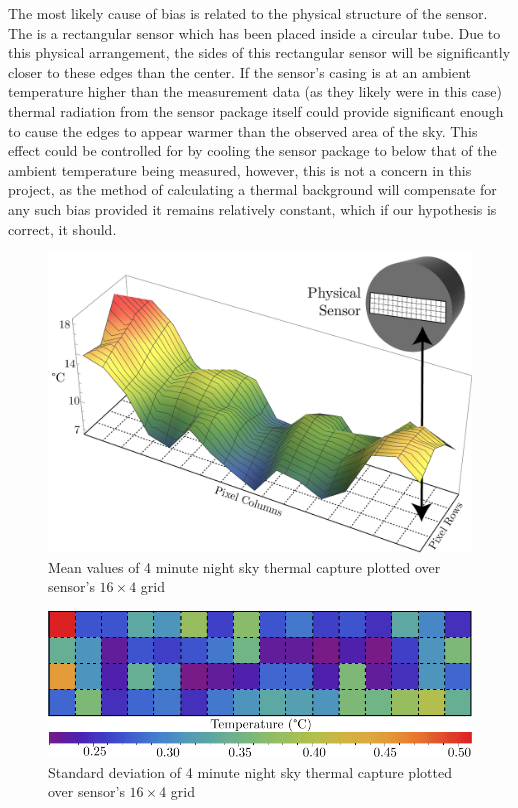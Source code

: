 \documentclass[../thesis/thesis.tex]{subfiles}
\begin{document}
The most likely cause of bias is related to the physical structure of the sensor. The \mlx is a rectangular sensor which has been placed inside a circular tube. Due to this physical arrangement, the sides of this rectangular sensor will be significantly closer to these edges than the center. If the sensor's casing is at an ambient temperature higher than the measurement data (as they likely were in this case) thermal radiation from the sensor package itself could provide significant enough to cause the edges to appear warmer than the observed area of the sky. This effect could be controlled for by cooling the sensor package to below that of the ambient temperature being measured, however, this is not a concern in this project, as the method of calculating a thermal background will compensate for any such bias provided it remains relatively constant, which if our hypothesis is correct, it should.

\begin{figure}
\centering
\includegraphics[width=\textwidth]{../diagrams/rest-avg-embed.pdf}
\caption{Mean values of 4 minute night sky thermal capture plotted over sensor's $16\times4$ grid}
\label{fig:meanplot}
\end{figure}

\begin{figure}
\centering
\includegraphics[width=\textwidth]{../diagrams/stddev-contour2.pdf}
\caption{Standard deviation of 4 minute night sky thermal capture plotted over sensor's $16\times4$ grid}
\label{fig:stdplot}
\end{figure}
\end{document}

